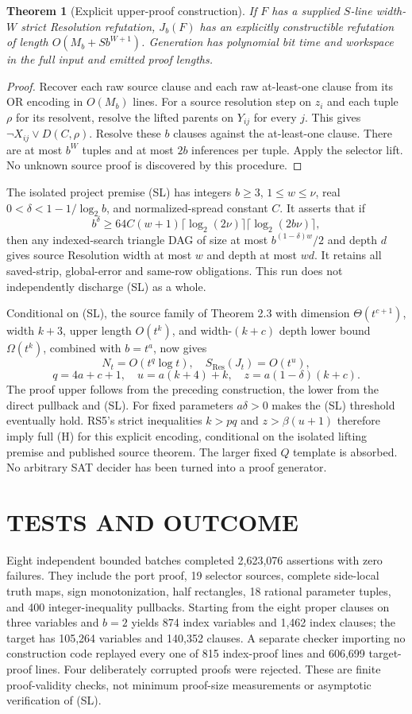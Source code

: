 \documentclass[11pt]{article}
\newtheorem{theorem}{Theorem}
\begin{document}
\begin{theorem}[Explicit upper-proof construction]
If $F$ has a supplied $S$-line width-$W$ strict Resolution refutation, $J_b(F)$ has an explicitly constructible refutation of length $O(M_b+S b^{W+1})$. Generation has polynomial bit time and workspace in the full input and emitted proof lengths.
\end{theorem}
\begin{proof}
Recover each raw source clause and each raw at-least-one clause from its OR encoding in $O(M_b)$ lines. For a source resolution step on $z_i$ and each tuple $\rho$ for its resolvent, resolve the lifted parents on $Y_{ij}$ for every $j$. This gives $\neg X_{ij}\vee D(C,\rho)$. Resolve these $b$ clauses against the at-least-one clause. There are at most $b^W$ tuples and at most $2b$ inferences per tuple. Apply the selector lift. No unknown source proof is discovered by this procedure.
\end{proof}

The isolated project premise (SL) has integers $b\ge3$, $1\le w\le\nu$, real $0<\delta<1-1/\log_2 b$, and normalized-spread constant $C$. It asserts that if
\[
b^\delta\ge64C(w+1)\lceil\log_2(2\nu)\rceil\lceil\log_2(2b\nu)\rceil,
\]
then any indexed-search triangle DAG of size at most $b^{(1-\delta)w}/2$ and depth $d$ gives source Resolution width at most $w$ and depth at most $wd$. It retains all saved-strip, global-error and same-row obligations. This run does not independently discharge (SL) as a whole.

Conditional on (SL), the source family of Theorem 2.3 with dimension $\Theta(t^{c+1})$, width $k+3$, upper length $O(t^k)$, and width-$(k+c)$ depth lower bound $\Omega(t^k)$, combined with $b=t^a$, now gives
\[
 N_t=O(t^q\log t),\quad S_{\mathrm{Res}}(J_t)=O(t^u),
\]
\[
 q=4a+c+1,\quad u=a(k+4)+k,\quad z=a(1-\delta)(k+c).
\]
The proof upper follows from the preceding construction, the lower from the direct pullback and (SL). For fixed parameters $a\delta>0$ makes the (SL) threshold eventually hold. RS5's strict inequalities $k>pq$ and $z>\beta(u+1)$ therefore imply full (H) for this explicit encoding, conditional on the isolated lifting premise and published source theorem. The larger fixed $Q$ template is absorbed. No arbitrary SAT decider has been turned into a proof generator.
\section{TESTS AND OUTCOME}
Eight independent bounded batches completed 2,623,076 assertions with zero failures. They include the port proof, 19 selector sources, complete side-local truth maps, sign monotonization, half rectangles, 18 rational parameter tuples, and 400 integer-inequality pullbacks. Starting from the eight proper clauses on three variables and $b=2$ yields 874 index variables and 1,462 index clauses; the target has 105,264 variables and 140,352 clauses. A separate checker importing no construction code replayed every one of 815 index-proof lines and 606,699 target-proof lines. Four deliberately corrupted proofs were rejected. These are finite proof-validity checks, not minimum proof-size measurements or asymptotic verification of (SL).
\end{document}
